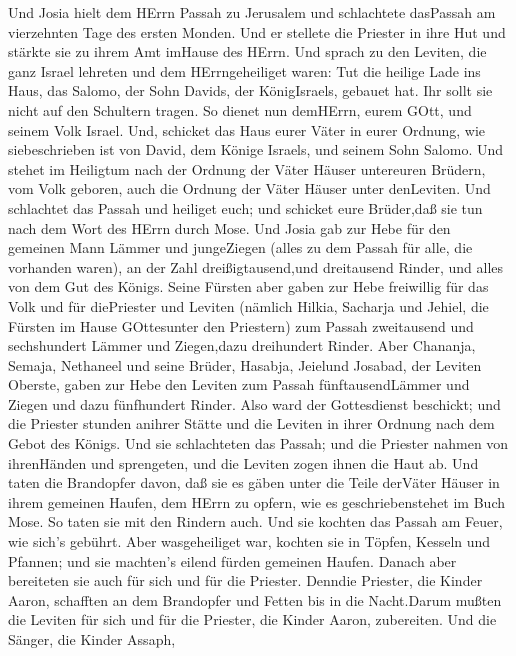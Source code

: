  Und Josia hielt dem HErrn Passah zu Jerusalem und
schlachtete dasPassah am vierzehnten Tage des ersten Monden.
 Und er stellete die Priester in ihre Hut und stärkte sie zu
ihrem Amt imHause des HErrn.  Und sprach zu den Leviten, die
ganz Israel lehreten und dem HErrngeheiliget waren: Tut die heilige Lade
ins Haus, das Salomo, der Sohn Davids, der KönigIsraels, gebauet hat.
Ihr sollt sie nicht auf den Schultern tragen. So dienet nun demHErrn,
eurem GOtt, und seinem Volk Israel.  Und, schicket das Haus
eurer Väter in eurer Ordnung, wie siebeschrieben ist von David, dem
Könige Israels, und seinem Sohn Salomo.  Und stehet im
Heiligtum nach der Ordnung der Väter Häuser untereuren Brüdern, vom Volk
geboren, auch die Ordnung der Väter Häuser unter denLeviten.
 Und schlachtet das Passah und heiliget euch; und schicket
eure Brüder,daß sie tun nach dem Wort des HErrn durch Mose. 
Und Josia gab zur Hebe für den gemeinen Mann Lämmer und jungeZiegen
(alles zu dem Passah für alle, die vorhanden waren), an der Zahl
dreißigtausend,und dreitausend Rinder, und alles von dem Gut des Königs.
 Seine Fürsten aber gaben zur Hebe freiwillig für das Volk
und für diePriester und Leviten (nämlich Hilkia, Sacharja und Jehiel,
die Fürsten im Hause GOttesunter den Priestern) zum Passah zweitausend
und sechshundert Lämmer und Ziegen,dazu dreihundert Rinder. 
Aber Chananja, Semaja, Nethaneel und seine Brüder, Hasabja, Jeielund
Josabad, der Leviten Oberste, gaben zur Hebe den Leviten zum Passah
fünftausendLämmer und Ziegen und dazu fünfhundert Rinder. 
Also ward der Gottesdienst beschickt; und die Priester stunden anihrer
Stätte und die Leviten in ihrer Ordnung nach dem Gebot des Königs.
 Und sie schlachteten das Passah; und die Priester nahmen
von ihrenHänden und sprengeten, und die Leviten zogen ihnen die Haut ab.
 Und taten die Brandopfer davon, daß sie es gäben unter die
Teile derVäter Häuser in ihrem gemeinen Haufen, dem HErrn zu opfern, wie
es geschriebenstehet im Buch Mose. So taten sie mit den Rindern auch.
 Und sie kochten das Passah am Feuer, wie sich's gebührt.
Aber wasgeheiliget war, kochten sie in Töpfen, Kesseln und Pfannen; und
sie machten's eilend fürden gemeinen Haufen.  Danach aber
bereiteten sie auch für sich und für die Priester. Denndie Priester, die
Kinder Aaron, schafften an dem Brandopfer und Fetten bis in die
Nacht.Darum mußten die Leviten für sich und für die Priester, die Kinder
Aaron, zubereiten.  Und die Sänger, die Kinder Assaph,
